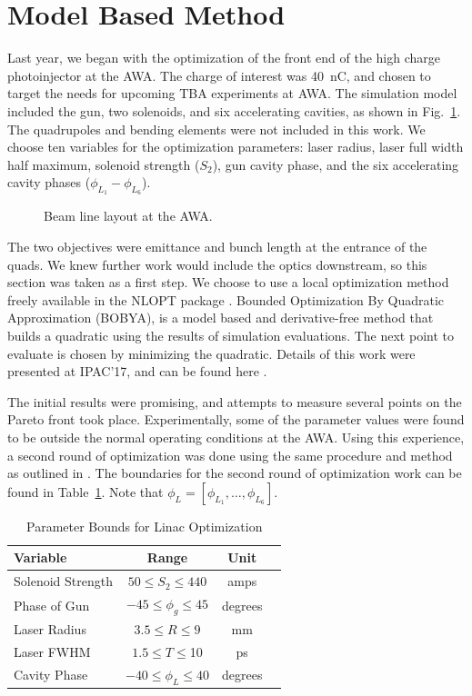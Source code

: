 \documentclass[letterpaper,  %
              ]{jacow-2_3}   %
\begin{document}
\section{Model Based Method}
Last year, we began with the optimization of the front end of 
the high charge photoinjector at the AWA. The charge
of interest was \SI{40}{nC}, and chosen to target the needs 
for upcoming TBA experiments at AWA.
The simulation model included the gun, two solenoids, 
and six accelerating cavities, as shown in Fig.~\ref{beamline}. 
The quadrupoles and bending elements were not included in this work.
We choose ten variables for the optimization parameters: 
laser radius, laser full width half maximum, solenoid strength ($S_2$), 
gun cavity phase, and the six accelerating cavity phases ($\phi_{L_1}-\phi_{L_6}$).
\begin{figure}
	\centering
	\begin{tikzpicture}[scale=0.7, text=black]
	
	\end{tikzpicture}	
	\caption{Beam line layout at the AWA.}
	\label{beamline}
\end{figure}

The two objectives were emittance and bunch length at the 
entrance of the quads. We knew further work would include the optics
downstream, so this section was taken as a first step. 
We choose to use a local optimization method freely available in the NLOPT package \cite{nlopt}. Bounded Optimization By Quadratic Approximation (BOBYA), 
is a model based and derivative-free method 
that builds a quadratic using the results of simulation evaluations. 
The next point to evaluate is chosen by minimizing the quadratic.
Details of this work were presented at IPAC'17, and can be found here \cite{denmark}. 

The initial results were promising, and attempts to measure
several points on the Pareto front took place.
Experimentally, some of the parameter values were found to 
be outside the normal operating conditions at the AWA.
Using this experience, a second round of optimization 
was done using the same procedure and method as 
outlined in \cite{denmark}. The boundaries for the second
round of optimization work can be found in Table~\ref{bounds}.
Note that $\phi_L=[\phi_{L_1},\ldots,\phi_{L_6}]$.

\begin{table}[hbt] 
	\centering
	\caption{Parameter Bounds for Linac Optimization}
	\begin{tabular}{ l *{3}{c}}
		\toprule
		\textbf{Variable} & \textbf{Range} & \textbf{Unit} \\
		\midrule
		Solenoid Strength & $ 50 \le S_2 \le 440$  & amps \\
		Phase of Gun & $-45 \le \phi_g \le 45$  & degrees \\
		Laser Radius  & $3.5 \le R \le 9$  & mm \\
		Laser FWHM & $1.5 \le T \le $10  & ps \\
		Cavity Phase & $-40 \le \phi_L \le 40$  & degrees \\
		\bottomrule	
	\end{tabular}	
	\label{bounds}
\end{table}
\end{document}
